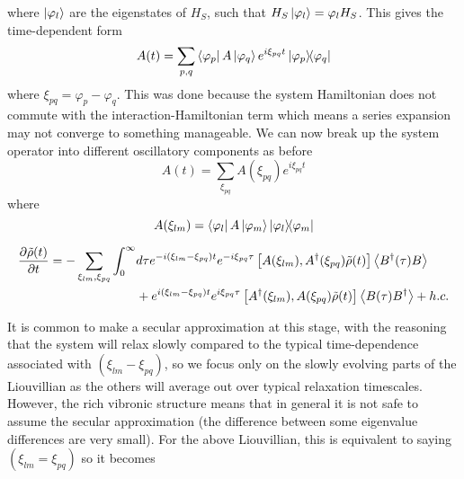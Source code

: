 \documentclass[]{article}
\begin{document}
where $\ket{\varphi_l}$ are the eigenstates of $H_S$, such that $H_S\ket{\varphi_l} = \varphi_l H_S$. This gives the time-dependent form
\begin{equation}
A(t) = \sum_{p,q} \bra{\varphi_p}A\ket{\varphi_q}e^{i\xi_{pq}t}\dyad{\varphi_p}{\varphi_q}
\end{equation}
where $\xi_{pq} = \varphi_p - \varphi_q$.
This was done because the system Hamiltonian does not commute with the interaction-Hamiltonian term which means a series expansion may not converge to something manageable. We can now break up the system operator into different oscillatory components as before
\begin{equation}
A(t) = \sum_{\xi_{pq}}A(\xi_{pq})e^{i\xi_{pq} t}
\end{equation} 
where 
\begin{equation}
A(\xi_{lm}) =  \bra{\varphi_l}A\ket{\varphi_m}\dyad{\varphi_l}{\varphi_m}
\end{equation}


\begin{align}
\begin{split}
\pdv{\tilde{\rho}(t)}{t} = - \sum_{\xi_{lm}, \xi_{pq}}\int_{0}^{\infty}& d\tau e^{-i(\xi_{lm}-\xi_{pq})t} e^{-i\xi_{pq}\tau} \left[A(\xi_{lm}), A^{\dagger}(\xi_{pq})\tilde{\rho}(t)\right] \expval{B^{\dagger}(\tau)B} \\
&+ e^{i(\xi_{lm}-\xi_{pq})t} e^{i\xi_{pq}\tau} \left[A^{\dagger}(\xi_{lm}), A(\xi_{pq})\tilde{\rho}(t)\right] \expval{B(\tau)B^{\dagger}} + h.c. 
\end{split}
\end{align}


It is common to make a secular approximation at this stage, with the reasoning that the system will relax slowly compared to the typical time-dependence associated with $(\xi_{lm}-\xi_{pq})$, so we focus only on the slowly evolving parts of the Liouvillian as the others will average out over typical relaxation timescales. However, the rich vibronic structure means that in general it is not safe to assume the secular approximation (the difference between some eigenvalue differences are very small). For the above Liouvillian, this is equivalent to saying $(\xi_{lm}=\xi_{pq})$ so it becomes
\end{document}
